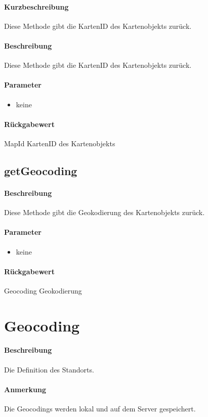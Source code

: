 \paragraph*{Kurzbeschreibung}
Diese Methode gibt die KartenID des Kartenobjekts zurück.
\paragraph*{Beschreibung}
Diese Methode gibt die KartenID des Kartenobjekts zurück.
\paragraph*{Parameter}
\begin{itemize}
    \item keine
\end{itemize}
\paragraph*{Rückgabewert}
MapId KartenID des Kartenobjekts

\subsection{getGeocoding}%
\paragraph*{Beschreibung}
Diese Methode gibt die Geokodierung des Kartenobjekts zurück.
\paragraph*{Parameter}
\begin{itemize}
    \item keine
\end{itemize}
\paragraph*{Rückgabewert}
Geocoding Geokodierung


\section{Geocoding}
\paragraph*{Beschreibung}
Die Definition des Standorts.
\paragraph*{Anmerkung}
Die Geocodings werden lokal und auf dem Server gespeichert.